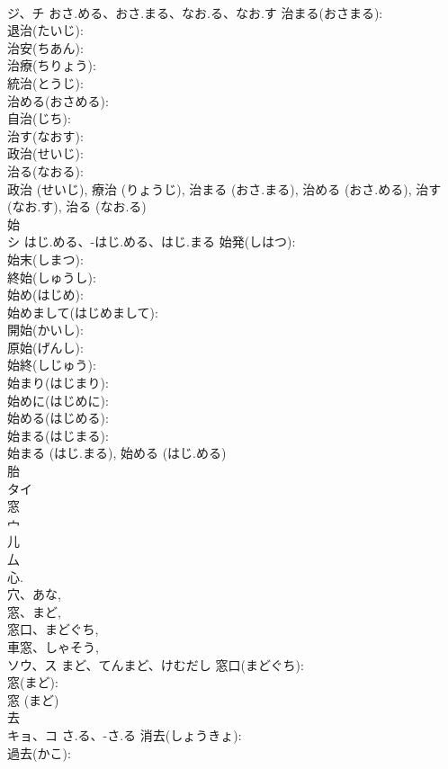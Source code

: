 \documentclass[8pt]{extreport}
\begin{document}
\begin{CJK}{UTF8}{min}
\\	ジ、チ	おさ.める、おさ.まる、なお.る、なお.す	治まる(おさまる): 
\\	退治(たいじ): 
\\	治安(ちあん): 
\\	治療(ちりょう): 
\\	統治(とうじ): 
\\	治める(おさめる): 
\\	自治(じち): 
\\	治す(なおす): 
\\	政治(せいじ): 
\\	治る(なおる): 
\\	政治 (せいじ), 療治 (りょうじ), 治まる (おさ.まる), 治める (おさ.める), 治す (なお.す), 治る (なお.る)
\\	始			
\\	シ	はじ.める、-はじ.める、はじ.まる	始発(しはつ): 
\\	始末(しまつ): 
\\	終始(しゅうし): 
\\	始め(はじめ): 
\\	始めまして(はじめまして): 
\\	開始(かいし): 
\\	原始(げんし): 
\\	始終(しじゅう): 
\\	始まり(はじまり): 
\\	始めに(はじめに): 
\\	始める(はじめる): 
\\	始まる(はじまる): 
\\	始まる (はじ.まる), 始める (はじ.める)
\\	胎			
\\	タイ			
\\	窓			
\\	宀 
\\	儿 
\\	厶 
\\	心. 
\\	穴、あな, 
\\	窓、まど, 
\\	窓口、まどぐち, 
\\	車窓、しゃそう, 
\\	ソウ、ス	まど、てんまど、けむだし	窓口(まどぐち): 
\\	窓(まど): 
\\	窓 (まど)
\\	去			
\\	キョ、コ	さ.る、-さ.る	消去(しょうきょ): 
\\	過去(かこ): 

\end{CJK}
\end{document}
